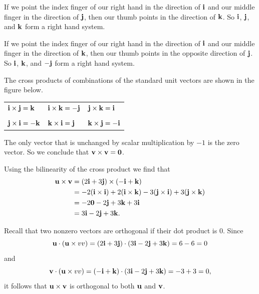\begin{activitySolution}
  \ba

  \item If we point the index finger of our right hand in the direction of $\mathbf{i}$ and our middle finger in the direction of $\mathbf{j}$, then our thumb points in the direction of $\mathbf{k}$. So $\mathbf{i}$, $\mathbf{j}$, and $\mathbf{k}$ form a right hand system.  
  \item If we point the index finger of our right hand in the direction of $\mathbf{i}$ and our middle finger in the direction of $\mathbf{k}$, then our thumb points in the opposite direction of $\mathbf{j}$. So $\mathbf{i}$, $\mathbf{k}$, and $-\mathbf{j}$ form a right hand system. 
  \item The cross products of combinations of the standard unit vectors are shown in the figure below. 
     \begin{center}
       \begin{tabular}{lll}
          $\mathbf{i}\times\mathbf{j} = \mathbf{k}$ \hspace*{1in} &
          $\mathbf{i}\times\mathbf{k} = -\mathbf{j}$ \hspace*{1in} &
          $\mathbf{j}\times\mathbf{k} = \mathbf{i}$\hspace*{1in} \\ \\
          $\mathbf{j}\times\mathbf{i} = -\mathbf{k}$ &
          $\mathbf{k}\times\mathbf{i} = \mathbf{j}$ &
          $\mathbf{k}\times\mathbf{j} = -\mathbf{i}$
       \end{tabular}
      \end{center}

  \item The only vector that is unchanged by scalar multiplication by $-1$ is the zero vector. So we conclude that $\mathbf{v} \times \mathbf{v} = \mathbf{0}$. 

  \item Using the bilinearity of the cross product we find that 
  \begin{align*}
\mathbf{u} \times \mathbf{v} &= (2\mathbf{i} + 3\mathbf{j}) \times (-\mathbf{i} + \mathbf{k}) \\
	&= -2(\mathbf{i} \times \mathbf{i}) + 2(\mathbf{i} \times \mathbf{k}) - 3 (\mathbf{j} \times \mathbf{i}) + 3(\mathbf{j} \times \mathbf{k}) \\
	&= -2 \mathbf{0} - 2\mathbf{j} +3 \mathbf{k} + 3\mathbf{i} \\
	&= 3 \mathbf{i} - 2 \mathbf{j} + 3 \mathbf{k}.
\end{align*}

  \item Recall that two nonzero vectors are orthogonal if their dot product is 0. Since 
\[\mathbf{u} \cdot (\mathbf{u} \times vv) = (2 \mathbf{i} + 3 \mathbf{j}) \cdot (3 \mathbf{i} - 2 \mathbf{j} + 3 \mathbf{k}) = 6 - 6 = 0\]
and
\[\mathbf{v} \cdot (\mathbf{u} \times vv) = (- \mathbf{i} +  \mathbf{k}) \cdot (3 \mathbf{i} - 2 \mathbf{j} + 3 \mathbf{k}) = -3 + 3 = 0,\]
it follows that $\mathbf{u} \times \mathbf{v}$ is orthogonal to both $\mathbf{u}$ and $\mathbf{v}$. 


\end{activitySolution}
